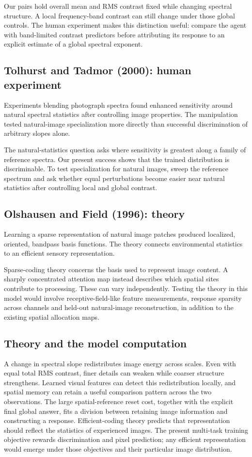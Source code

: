 \documentclass[11pt]{article}
\begin{document}
Our pairs hold overall mean and RMS contrast fixed while changing spectral structure. A local frequency-band contrast can still change under those global controls. The human experiment makes this distinction useful: compare the agent with band-limited contrast predictors before attributing its response to an explicit estimate of a global spectral exponent.

\subsection{Tolhurst and Tadmor (2000): human experiment}
Experiments blending photograph spectra found enhanced sensitivity around natural spectral statistics after controlling image properties. The manipulation tested natural-image specialization more directly than successful discrimination of arbitrary slopes alone. \cite{bio_tolhurst00}

The natural-statistics question asks where sensitivity is greatest along a family of reference spectra. Our present success shows that the trained distribution is discriminable. To test specialization for natural images, sweep the reference spectrum and ask whether equal perturbations become easier near natural statistics after controlling local and global contrast.

\subsection{Olshausen and Field (1996): theory}
Learning a sparse representation of natural image patches produced localized, oriented, bandpass basis functions. The theory connects environmental statistics to an efficient sensory representation. \cite{bio_olshausen}

Sparse-coding theory concerns the basis used to represent image content. A sharply concentrated attention map instead describes which spatial sites contribute to processing. These can vary independently. Testing the theory in this model would involve receptive-field-like feature measurements, response sparsity across channels and held-out natural-image reconstruction, in addition to the existing spatial allocation maps.

\subsection{Theory and the model computation}
A change in spectral slope redistributes image energy across scales. Even with equal total RMS contrast, finer details can weaken while coarser structure strengthens. Learned visual features can detect this redistribution locally, and spatial memory can retain a useful comparison pattern across the two observations. The large spatial-reference reset cost, together with the explicit final global answer, fits a division between retaining image information and constructing a response. Efficient-coding theory predicts that representation should reflect the statistics of experienced images. The present multi-task training objective rewards discrimination and pixel prediction; any efficient representation would emerge under those objectives and their particular image distribution.
\end{document}
